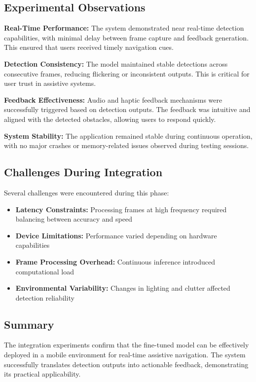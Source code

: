 \documentclass{FastFyp}
\begin{document}
\subsection{Experimental Observations}

\textbf{Real-Time Performance:}  
The system demonstrated near real-time detection capabilities, with minimal delay between frame capture and feedback generation. This ensured that users received timely navigation cues.

\textbf{Detection Consistency:}  
The model maintained stable detections across consecutive frames, reducing flickering or inconsistent outputs. This is critical for user trust in assistive systems.

\textbf{Feedback Effectiveness:}  
Audio and haptic feedback mechanisms were successfully triggered based on detection outputs. The feedback was intuitive and aligned with the detected obstacles, allowing users to respond quickly.

\textbf{System Stability:}  
The application remained stable during continuous operation, with no major crashes or memory-related issues observed during testing sessions.

\subsection{Challenges During Integration}

Several challenges were encountered during this phase:

\begin{itemize}
    \item \textbf{Latency Constraints:} Processing frames at high frequency required balancing between accuracy and speed
    \item \textbf{Device Limitations:} Performance varied depending on hardware capabilities
    \item \textbf{Frame Processing Overhead:} Continuous inference introduced computational load
    \item \textbf{Environmental Variability:} Changes in lighting and clutter affected detection reliability
\end{itemize}


\subsection{Summary}

The integration experiments confirm that the fine-tuned model can be effectively deployed in a mobile environment for real-time assistive navigation. The system successfully translates detection outputs into actionable feedback, demonstrating its practical applicability.
\end{document}

